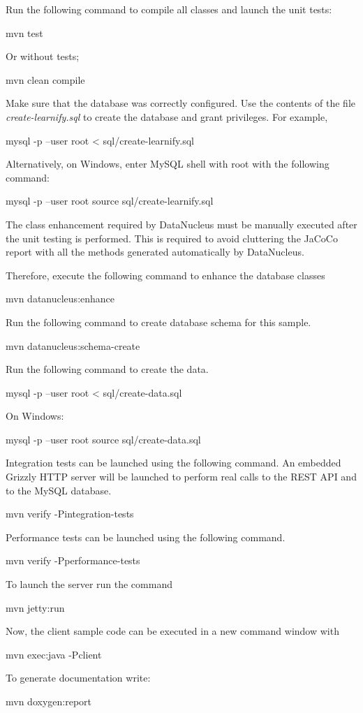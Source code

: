 Run the following command to compile all classes and launch the unit tests\+: \begin{DoxyVerb}  mvn test
\end{DoxyVerb}
 Or without tests; \begin{DoxyVerb}  mvn clean compile
\end{DoxyVerb}
 Make sure that the database was correctly configured. Use the contents of the file {\itshape create-\/learnify.\+sql} to create the database and grant privileges. For example, \begin{DoxyVerb}  mysql -p --user root < sql/create-learnify.sql
\end{DoxyVerb}
 Alternatively, on Windows, enter My\+SQL shell with root with the following command\+: \begin{DoxyVerb}  mysql -p --user root
  source sql/create-learnify.sql
\end{DoxyVerb}
 The class enhancement required by Data\+Nucleus must be manually executed after the unit testing is performed. This is required to avoid cluttering the Ja\+Co\+Co report with all the methods generated automatically by Data\+Nucleus.

Therefore, execute the following command to enhance the database classes \begin{DoxyVerb}  mvn datanucleus:enhance
\end{DoxyVerb}
 Run the following command to create database schema for this sample. \begin{DoxyVerb}  mvn datanucleus:schema-create
\end{DoxyVerb}
 Run the following command to create the data. \begin{DoxyVerb}  mysql -p --user root < sql/create-data.sql
\end{DoxyVerb}
 On Windows\+: \begin{DoxyVerb}  mysql -p --user root
  source sql/create-data.sql  
\end{DoxyVerb}
 Integration tests can be launched using the following command. An embedded Grizzly HTTP server will be launched to perform real calls to the REST API and to the My\+SQL database. \begin{DoxyVerb}  mvn verify -Pintegration-tests
\end{DoxyVerb}
 Performance tests can be launched using the following command. \begin{DoxyVerb}  mvn verify -Pperformance-tests
\end{DoxyVerb}
 To launch the server run the command \begin{DoxyVerb}  mvn jetty:run
\end{DoxyVerb}
 Now, the client sample code can be executed in a new command window with \begin{DoxyVerb}  mvn exec:java -Pclient
\end{DoxyVerb}
 To generate documentation write\+: \begin{DoxyVerb}  mvn doxygen:report
\end{DoxyVerb}
 